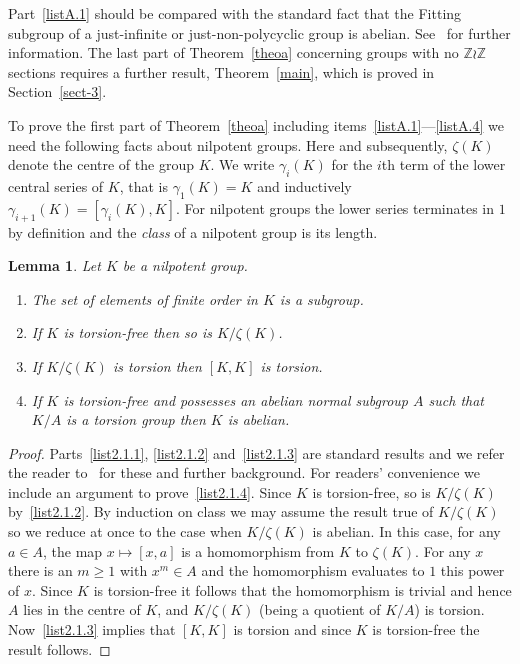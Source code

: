\documentclass[11pt]{article}
\newtheorem{lemm}[theo]{Lemma}
\theoremstyle{definition}
\numberwithin{equation}{section}
\numberwithin{figure}{section}
\numberwithin{table}{section}
\newcommand{\Z}{\mathbb{Z}}
\newcommand*{\romanenumi}{\renewcommand*{\theenumi}{\roman{enumi}}}
\begin{document}
Part~\eqref{listA.1} should be compared with the standard fact that the Fitting subgroup of a just-infinite or just-non-polycyclic group is abelian. See~\cite{RW} for further information. The last part of Theorem~\ref{theoa} concerning groups with no $\Z\wr\Z$ sections requires a further result, Theorem~\ref{main}, which is proved in Section~\ref{sect-3}.

To prove the first part of Theorem~\ref{theoa} including items~\eqref{listA.1}---\eqref{listA.4} we need the following facts about nilpotent groups. Here and subsequently, $\zeta(K)$ denote the centre of the group $K$. We write $\gamma_i(K)$ for the $i$th term of the lower central series of $K$, that is $\gamma_1(K)=K$ and inductively $\gamma_{i+1}(K)=[\gamma_i(K),K]$. For nilpotent groups the lower series terminates in $1$ by definition and the \emph{class} of a nilpotent group is its length.

\begin{lemm}\label{lem2.1}
Let $K$ be a nilpotent group.
\begin{enumerate}\romanenumi
\item \label{list2.1.1}The set of elements of finite order in $K$ is a subgroup.
\item \label{list2.1.2}If $K$ is torsion-free then so is $K/\zeta(K)$.
\item \label{list2.1.3}If $K/\zeta(K)$ is torsion then $[K,K]$ is torsion.
\item \label{list2.1.4}If $K$ is torsion-free and possesses an abelian normal subgroup $A$ such that $K/A$ is a torsion group then $K$ is abelian.
\end{enumerate}
\end{lemm}
\begin{proof}
Parts~\eqref{list2.1.1}, \eqref{list2.1.2} and~\eqref{list2.1.3} are standard results and we refer the reader to~\cite{Rob96} for these and further background. For readers' convenience we include an argument to prove~\eqref{list2.1.4}. Since $K$ is torsion-free, so is $K/\zeta(K)$ by~\eqref{list2.1.2}. By induction on class we may assume the result true of $K/\zeta(K)$ so we reduce at once to the case when $K/\zeta(K)$ is abelian. In this case, for any $a\in A$, the map $x\mapsto[x,a]$ is a homomorphism from $K$ to $\zeta(K)$. For any $x$ there is an $m\ge1$ with $x^m\in A$ and the homomorphism evaluates to $1$ this power of $x$. Since $K$ is torsion-free it follows that the homomorphism is trivial and hence $A$ lies in the centre of $K$, and $K/\zeta(K)$ (being a quotient of $K/A$) is torsion. Now~\eqref{list2.1.3} implies that $[K,K]$ is torsion and since $K$ is torsion-free the result follows.
\end{proof}
\end{document}
